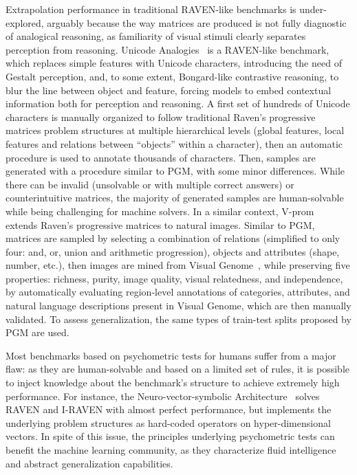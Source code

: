 Extrapolation performance in traditional RAVEN-like benchmarks is under-explored, arguably because the way matrices are produced is not fully diagnostic of analogical reasoning, as familiarity of visual stimuli clearly separates perception from reasoning.
Unicode Analogies~\cite{spratley2023unicode} is a RAVEN-like benchmark, which replaces simple features with Unicode characters, introducing the need of Gestalt perception, and, to some extent, Bongard-like contrastive reasoning, to blur the line between object and feature, forcing models to embed contextual information both for perception and reasoning.
A first set of hundreds of Unicode characters is manually organized to follow traditional Raven's progressive matrices problem structures at multiple hierarchical levels (global features, local features and relations between ``objects'' within a character), then an automatic procedure is used to annotate thousands of characters.
Then, samples are generated with a procedure similar to PGM, with some minor differences.
While there can be invalid (unsolvable or with multiple correct answers) or counterintuitive matrices, the majority of generated samples are human-solvable while being challenging for machine solvers.
In a similar context, V-prom~\cite{teney2020v} extends Raven's progressive matrices to natural images.
Similar to PGM, matrices are sampled by selecting a combination of relations (simplified to only four: and, or, union and arithmetic progression), objects and attributes (shape, number, etc.), then images are mined from Visual Genome~\cite{krishna2017visual}, while preserving five properties: richness, purity, image quality, visual relatedness, and independence, by automatically evaluating region-level annotations of categories, attributes, and natural language descriptions present in Visual Genome, which are then manually validated.
To assess generalization, the same types of train-test splits proposed by PGM are used.
%
%   
%
%
%   
%
%

Most benchmarks based on psychometric tests for humans suffer from a major flaw: as they are human-solvable and based on a limited set of rules, it is possible to inject knowledge about the benchmark's structure to achieve extremely high performance. For instance, the Neuro-vector-symbolic Architecture~\cite{hersche2023neuro} solves RAVEN and I-RAVEN with almost perfect performance, but implements the underlying problem structures as hard-coded operators on hyper-dimensional vectors.
In spite of this issue, the principles underlying psychometric tests can benefit the machine learning community, as they characterize fluid intelligence and abstract generalization capabilities.


